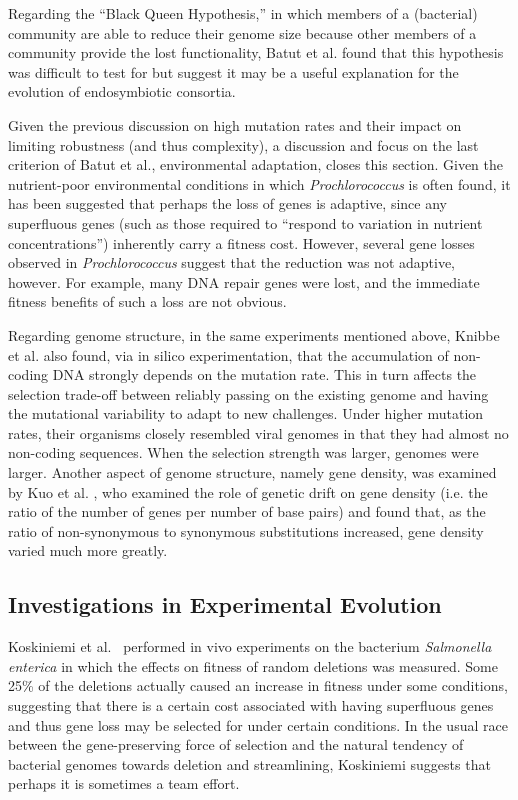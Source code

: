 Regarding the ``Black Queen Hypothesis,'' in which members of a (bacterial) community are able to reduce their genome size because other members of a community provide the lost functionality, Batut et al. found that this hypothesis was difficult to test for but suggest it may be a useful explanation for the evolution of endosymbiotic consortia.  

Given the previous discussion on high mutation rates and their impact on limiting robustness (and thus complexity), a discussion and focus on the last criterion of Batut et al., environmental adaptation, closes this section. Given the nutrient-poor environmental conditions in which \textit{Prochlorococcus} is often found, it has been suggested that perhaps the loss of genes is adaptive, since any superfluous genes (such as those required to ``respond to variation in nutrient concentrations'') inherently carry a fitness cost. However, several gene losses observed in \textit{Prochlorococcus} suggest that the reduction was not adaptive, however. For example, many DNA repair genes were lost, and the immediate fitness benefits of such a loss are not obvious. 

Regarding genome structure, in the same experiments mentioned above, Knibbe et al.\cite{Knibbe2007} also found, via in silico experimentation, that the accumulation of non-coding DNA strongly depends on the mutation rate. This in turn affects the selection trade-off between reliably passing on the existing genome and having the mutational variability to adapt to new challenges.  Under higher mutation rates, their organisms closely resembled viral genomes in that they had almost no non-coding sequences. When the selection strength was larger, genomes were larger.  Another aspect of genome structure, namely gene density, was examined by Kuo et al. \cite{kuo2009consequences}, who examined the role of genetic drift on gene density (i.e. the ratio of the number of genes per number of base pairs) and found that, as the ratio of non-synonymous to synonymous substitutions increased, gene density varied much more greatly.
\subsection{Investigations in Experimental Evolution}

Koskiniemi et al.~\cite{koskiniemi2012} performed in vivo experiments on the bacterium \textit{Salmonella enterica} in which the effects on fitness of random deletions was measured. Some 25\% of the deletions actually caused an increase in fitness under some conditions, suggesting that there is a certain cost associated with having superfluous genes and thus gene loss may be selected for under certain conditions. In the usual race between the gene-preserving force of selection and the natural tendency of bacterial genomes towards deletion and streamlining, Koskiniemi suggests that perhaps it is sometimes a team effort. 

